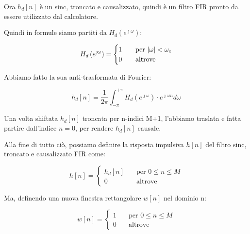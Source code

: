 Ora $h_d \left[ n\right]$ è un sinc, troncato e causalizzato, quindi è un filtro FIR pronto da essere utilizzato dal calcolatore. \newline 

Quindi in formule siamo partiti da $H_d \left(e^{\jmath \omega}\right)$: 

{
    \Large 
    \begin{equation}
        H_d \left(e^{\jmath \omega}\right) 
        = 
        \begin{cases}
            1 \quad &\text{per } \abs{\omega} < \omega_c 
            \\ 
            0 \quad &\text{altrove } 
        \end{cases} 
    \end{equation}
} 

Abbiamo fatto la sua anti-trasformata di Fourier: 

{
    \Large 
    \begin{equation}
        h_d \left[ n\right] 
        = 
        \dfrac{1}{2 \pi}
        \int_{- \pi}^{+ \pi} 
        H_d \left(e^{\jmath \omega}\right) 
        \cdot 
        e^{\jmath \omega n} 
        d \omega
    \end{equation}
} 

Una volta shiftata $h_d \left[ n\right]$ troncata per n-indici M+1, l'abbiamo traslata e fatta partire dall'indice $n = 0$, 
per rendere $h_d \left[ n\right]$ causale. \newline 

Alla fine di tutto ciò, possiamo definire la risposta impulsiva $h \left[ n\right]$ del filtro sinc, troncato e causalizzato FIR come: 

{
    \Large 
    \begin{equation}
        h \left[ n\right] 
        = 
        \begin{cases}
            h_d \left[ n\right] \quad &\text{per } 0 \leq n \leq M
            \\ 
            0 \quad &\text{altrove } 
        \end{cases}
    \end{equation}
}

Ma, definendo una nuova finestra rettangolare $w \left[ n\right]$ nel dominio n: 

{
    \Large 
    \begin{equation}
        w \left[ n\right] 
        = 
        \begin{cases}
            1 \quad &\text{per } 0 \leq n \leq M
            \\ 
            0 \quad &\text{altrove } 
        \end{cases}
    \end{equation}
}

